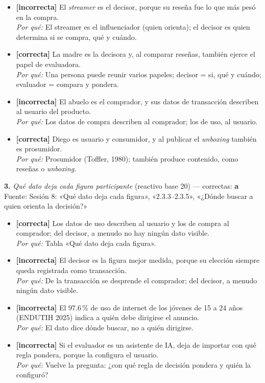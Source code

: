 \documentclass[10pt,letterpaper]{article}
\begin{document}
\begin{itemize}[leftmargin=1.2em,itemsep=0pt,topsep=1pt,parsep=0pt]
\item[\textbf{a)}] {\footnotesize \textbf{[incorrecta]} El \textit{streamer} es el decisor, porque su reseña fue lo que más pesó en la compra.\\ \textit{Por qué:} El streamer es el influenciador (quien orienta); el decisor es quien determina si se compra, qué y cuándo.}
\item[\textbf{b)}] {\footnotesize \textbf{[correcta]} La madre es la decisora y, al comparar reseñas, también ejerce el papel de evaluadora.\\ \textit{Por qué:} Una persona puede reunir varios papeles; decisor = si, qué y cuándo; evaluador = compara y pondera.}
\item[\textbf{c)}] {\footnotesize \textbf{[incorrecta]} El abuelo es el comprador, y sus datos de transacción describen al usuario del producto.\\ \textit{Por qué:} Los datos de compra describen al comprador; los de uso, al usuario.}
\item[\textbf{d)}] {\footnotesize \textbf{[correcta]} Diego es usuario y consumidor, y al publicar el \textit{unboxing} también es prosumidor.\\ \textit{Por qué:} Prosumidor (Toffler, 1980): también produce contenido, como reseñas o \textit{unboxing}.}
\end{itemize}
\vspace{3pt}\noindent\textbf{3.} \textit{Qué dato deja cada figura participante} (reactivo base 20) — correctas: \textbf{a}\\[-1pt]
{\scriptsize Fuente: Sesión 8: «Qué dato deja cada figura», «2.3.3--2.3.5», «¿Dónde buscar a quien orienta la decisión?»}
\begin{itemize}[leftmargin=1.2em,itemsep=0pt,topsep=1pt,parsep=0pt]
\item[\textbf{a)}] {\footnotesize \textbf{[correcta]} Los datos de uso describen al usuario y los de compra al comprador; del decisor, a menudo no hay ningún dato visible.\\ \textit{Por qué:} Tabla «Qué dato deja cada figura».}
\item[\textbf{b)}] {\footnotesize \textbf{[incorrecta]} El decisor es la figura mejor medida, porque su elección siempre queda registrada como transacción.\\ \textit{Por qué:} De la transacción se desprende el comprador; del decisor, a menudo ningún dato visible.}
\item[\textbf{c)}] {\footnotesize \textbf{[incorrecta]} El 97.6\,\% de uso de internet de los jóvenes de 15 a 24 años (ENDUTIH 2025) indica a quién debe dirigirse el anuncio.\\ \textit{Por qué:} El dato dice dónde buscar, no a quién dirigirse.}
\item[\textbf{d)}] {\footnotesize \textbf{[incorrecta]} Si el evaluador es un asistente de IA, deja de importar con qué regla pondera, porque la configura el usuario.\\ \textit{Por qué:} Vuelve la pregunta: ¿con qué regla de decisión pondera y quién la configuró?}
\end{itemize}
\end{document}
